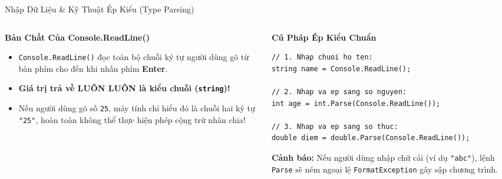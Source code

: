 \documentclass[aspectratio=169, 10pt]{beamer}
\begin{document}
\begin{frame}[fragile]{Nhập Dữ Liệu \& Kỹ Thuật Ép Kiểu (Type Parsing)}
  \begin{columns}[T]
    \begin{column}{0.5\textwidth}
      \begin{alertblock}{\textbf{Bản Chất Của Console.ReadLine()}}
        \begin{itemize}
          \item \texttt{Console.ReadLine()} đọc toàn bộ chuỗi ký tự người dùng gõ từ bàn phím cho đến khi nhấn phím \textbf{Enter}.
          \item \textbf{Giá trị trả về LUÔN LUÔN là kiểu chuỗi (\texttt{string})!}
          \item Nếu người dùng gõ số \texttt{25}, máy tính chỉ hiểu đó là chuỗi hai ký tự \texttt{"25"}, hoàn toàn không thể thực hiện phép cộng trừ nhân chia!
        \end{itemize}
      \end{alertblock}
    \end{column}
    \begin{column}{0.46\textwidth}
      \begin{exampleblock}{\textbf{Cú Pháp Ép Kiểu Chuẩn}}
\begin{lstlisting}
// 1. Nhap chuoi ho ten:
string name = Console.ReadLine();

// 2. Nhap va ep sang so nguyen:
int age = int.Parse(Console.ReadLine());

// 3. Nhap va ep sang so thuc:
double diem = double.Parse(Console.ReadLine());
\end{lstlisting}
      \end{exampleblock}
      \begin{tcolorbox}[colback=AlertRed!10,colframe=AlertRed]
        \textbf{Cảnh báo:} Nếu người dùng nhập chữ cái (ví dụ \texttt{"abc"}), lệnh \texttt{Parse} sẽ ném ngoại lệ \texttt{FormatException} gây sập chương trình.
      \end{tcolorbox}
    \end{column}
  \end{columns}
\end{frame}
\end{document}
